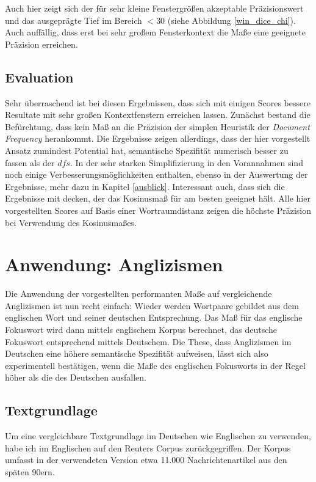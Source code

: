 \documentclass[11pt,numbers=noenddot]{scrartcl}
\begin{document}
Auch hier zeigt sich der für sehr kleine Fenstergrößen akzeptable Präzisionswert und das ausgeprägte Tief im Bereich $<30$ (siehe Abbildung \ref{win_dice_chi}). Auch auffällig, dass erst bei sehr großem Fensterkontext die Maße eine geeignete Präzision erreichen.


\subsection{Evaluation}

Sehr überraschend ist bei diesen Ergebnissen, dass sich mit einigen Scores bessere Resultate mit sehr großen Kontextfenstern erreichen lassen. Zunächst bestand die Befürchtung, dass kein Maß an die Präzision der simplen Heuristik der \emph{Document Frequency} herankommt. Die Ergebnisse zeigen allerdings, dass der hier vorgestellt Ansatz zumindest Potential hat, semantische Spezifität numerisch besser zu fassen als der $dfs$. In der sehr starken Simplifizierung in den Vorannahmen sind noch einige Verbesserungsmöglichkeiten enthalten, ebenso in der Auswertung der Ergebnisse, mehr dazu in Kapitel \ref{ausblick}.
Interessant auch, dass sich die Ergebnisse mit \citet[S. 35]{sahlgren2006word} decken, der das Kosinusmaß für am besten geeignet hält. Alle hier vorgestellten Scores auf Basis einer Wortraumdistanz zeigen die höchste Präzision bei Verwendung des Kosinusmaßes.

\section{Anwendung: Anglizismen}

Die Anwendung der vorgestellten performanten Maße auf vergleichende Anglizismen ist nun recht einfach: Wieder werden Wortpaare gebildet aus dem englischen Wort und seiner deutschen Entsprechung. Das Maß für das englische Fokuswort wird dann mittels englischem Korpus berechnet, das deutsche Fokuswort entsprechend mittels Deutschem. Die These, dass Anglizismen im Deutschen eine höhere semantische Spezifität aufweisen, lässt sich also experimentell bestätigen, wenn die Maße des englischen Fokusworts in der Regel höher als die des Deutschen ausfallen.

\subsection{Textgrundlage}

Um eine vergleichbare Textgrundlage im Deutschen wie Englischen zu verwenden, habe ich im Englischen auf den Reuters Corpus \citep{Lewis:2004:RNB:1005332.1005345} zurückgegriffen. Der Korpus umfasst in der verwendeten Version etwa 11.000 Nachrichtenartikel aus den späten 90ern.
\end{document}
